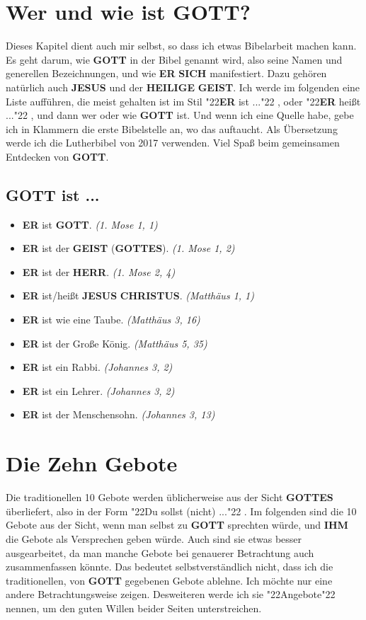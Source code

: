 \documentclass[10pt,a5paper]{article}
\newcommand{\Christus}[0]{\textbf{CHRISTUS}}
\newcommand{\Er}[0]{\textbf{ER}}
\newcommand{\Geist}[0]{\textbf{GEIST}}
\newcommand{\Gottes}[0]{\textbf{GOTTES}}
\newcommand{\Gott}[0]{\textbf{GOTT}}
\newcommand{\Heilige}[0]{\textbf{HEILIGE}}
\newcommand{\Herr}[0]{\textbf{HERR}}
\newcommand{\Ihm}[0]{\textbf{IHM}}
\newcommand{\Jesus}[0]{\textbf{JESUS}}
\newcommand{\Sich}[0]{\textbf{SICH}}
\newcommand{\q}[1]{\char"22{#1}\char"22 }
\begin{document}
	\newpage
	\section{Wer und wie ist {\Gott}?}
		Dieses Kapitel dient auch mir selbst,
		so dass ich etwas Bibelarbeit machen kann.
		Es geht darum,
		wie {\Gott} in der Bibel genannt wird,
		also seine Namen und generellen Bezeichnungen,
		und wie {\Er} {\Sich} manifestiert.
		Dazu geh\"oren nat\"urlich auch {\Jesus} und der {\Heilige} {\Geist}.
		Ich werde im folgenden eine Liste auff\"uhren,
		die meist gehalten ist im Stil \q{{\Er} ist ...},
		oder \q{{\Er} hei{\ss}t ...},
		und dann wer oder wie {\Gott} ist.
		Und wenn ich eine Quelle habe,
		gebe ich in Klammern die erste Bibelstelle an,
		wo das auftaucht.
		Als \"Ubersetzung werde ich die Lutherbibel von 2017 verwenden.
		Viel Spa{\ss} beim gemeinsamen Entdecken von {\Gott}.
	
	\subsection{{\Gott} ist ...}
		\begin{itemize}[nosep]
			\item {\Er} ist {\Gott}. \textit{(1. Mose 1, 1)}
			\item {\Er} ist der {\Geist} ({\Gottes}). \textit{(1. Mose 1, 2)}
			\item {\Er} ist der {\Herr}. \textit{(1. Mose 2, 4)}
			\item {\Er} ist/hei{\ss}t {\Jesus} {\Christus}. \textit{(Matth\"aus 1, 1)}
			\item {\Er} ist wie eine Taube. \textit{(Matth\"aus 3, 16)}
			\item {\Er} ist der Gro{\ss}e K\"onig. \textit{(Matth\"aus 5, 35)}
			\item {\Er} ist ein Rabbi. \textit{(Johannes 3, 2)}
			\item {\Er} ist ein Lehrer. \textit{(Johannes 3, 2)}
			\item {\Er} ist der Menschensohn. \textit{(Johannes 3, 13)}
		\end{itemize}
		
	\newpage
	\section{Die Zehn Gebote}
		Die traditionellen 10 Gebote werden \"ublicherweise aus der Sicht {\Gottes} \"uberliefert,
		also in der Form \q{Du sollst (nicht) ...}.
		Im folgenden sind die 10 Gebote aus der Sicht,
		wenn man selbst zu {\Gott} sprechten w\"urde,
		und {\Ihm} die Gebote als Versprechen geben w\"urde.
		Auch sind sie etwas besser ausgearbeitet,
		da man manche Gebote bei genauerer Betrachtung auch zusammenfassen k\"onnte.
		Das bedeutet selbstverst\"andlich nicht,
		dass ich die traditionellen,
		von {\Gott} gegebenen Gebote ablehne.
		Ich m\"ochte nur eine andere Betrachtungsweise zeigen.
		Desweiteren werde ich sie \q{Angebote} nennen,
		um den guten Willen beider Seiten unterstreichen.
	
\end{document}
